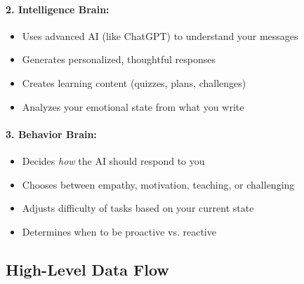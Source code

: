 \documentclass[12pt,a4paper]{article}
\begin{document}
\paragraph{2. Intelligence Brain:}
\begin{itemize}
    \item Uses advanced AI (like ChatGPT) to understand your messages
    \item Generates personalized, thoughtful responses
    \item Creates learning content (quizzes, plans, challenges)
    \item Analyzes your emotional state from what you write
\end{itemize}

\paragraph{3. Behavior Brain:}
\begin{itemize}
    \item Decides \textit{how} the AI should respond to you
    \item Chooses between empathy, motivation, teaching, or challenging
    \item Adjusts difficulty of tasks based on your current state
    \item Determines when to be proactive vs. reactive
\end{itemize}

\subsection{High-Level Data Flow}
\end{document}
